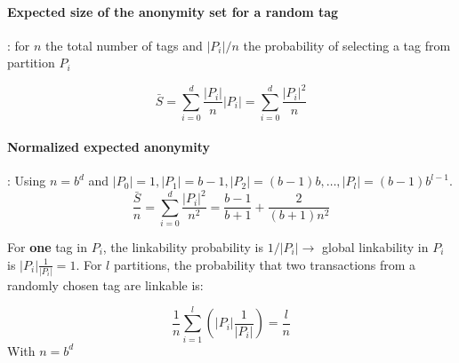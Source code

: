 \documentclass[10pt, a4paper,twocolumn]{scrartcl}
\begin{document}
\paragraph{Expected size of the anonymity set for a random tag}: for $n$ the total number of tags and $|P_i|/n$ the probability of selecting a tag from partition $P_i$

\begin{equation*}
\bar S = \sum_{i=0}^d \frac {|P_i|}n|P_i| =  \sum_{i=0}^d \frac {|P_i|^2}n
\end{equation*}

\paragraph{Normalized expected anonymity} : 
Using $n = b^d$ and $|P_0| = 1, |P_1| = b-1, |P_2| = (b-1)b, \ldots, |P_l| = (b-1)b^{l-1}$.
\begin{equation*}
	\frac{\bar{S}}n = \sum_{i=0}^d \frac {|P_i|^2}{n^2} = \frac{b-1}{b+1} + \frac2{(b+1)n^2}
\end{equation*}

For \textbf{one} tag in $P_i$, the linkability probability is  $1/|P_i| \rightarrow$ global linkability in $P_i$ is $|P_i|\frac1{|P_i|} = 1$. For $l$ partitions, the probability that two transactions from a randomly chosen tag are linkable is:

\begin{equation*}
\frac1n\sum_{i=1}^l(|P_i|\frac1{|P_i|}) = \frac ln
\end{equation*}
With $n = b^d$
\end{document}
